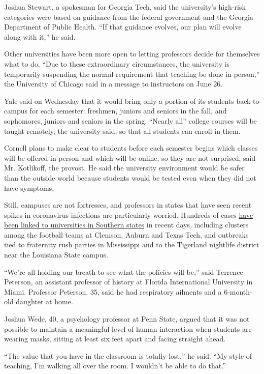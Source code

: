 Joshua Stewart, a spokesman for Georgia Tech, said the university's
high-risk categories were based on guidance from the federal government
and the Georgia Department of Public Health. ``If that guidance evolves,
our plan will evolve along with it,'' he said.

Other universities have been more open to letting professors decide for
themselves what to do. ``Due to these extraordinary circumstances, the
university is temporarily suspending the normal requirement that
teaching be done in person,'' the University of Chicago said in a
message to instructors on June 26.

Yale said on Wednesday that it would bring only a portion of its
students back to campus for each semester: freshmen, juniors and seniors
in the fall, and sophomores, juniors and seniors in the spring. ``Nearly
all'' college courses will be taught remotely, the university said, so
that all students can enroll in them.

Cornell plans to make clear to students before each semester begins
which classes will be offered in person and which will be online, so
they are not surprised, said Mr. Kotlikoff, the provost. He said the
university environment would be safer than the outside world because
students would be tested even when they did not have symptoms.

Still, campuses are not fortresses, and professors in states that have
seen recent spikes in coronavirus infections are particularly worried.
Hundreds of cases
\href{https://www.nytimes.com/2020/06/28/us/coronavirus-college-towns.html}{have
been linked to universities in Southern states} in recent days,
including clusters among the football teams at Clemson, Auburn and Texas
Tech, and outbreaks tied to fraternity rush parties in Mississippi and
to the Tigerland nightlife district near the Louisiana State campus.

``We're all holding our breath to see what the policies will be,'' said
Terrence Peterson, an assistant professor of history at Florida
International University in Miami. Professor Peterson, 35, said he had
respiratory ailments and a 6-month-old daughter at home.

Joshua Wede, 40, a psychology professor at Penn State, argued that it
was not possible to maintain a meaningful level of human interaction
when students are wearing masks, sitting at least six feet apart and
facing straight ahead.

``The value that you have in the classroom is totally lost,'' he said.
``My style of teaching, I'm walking all over the room. I wouldn't be
able to do that.''

